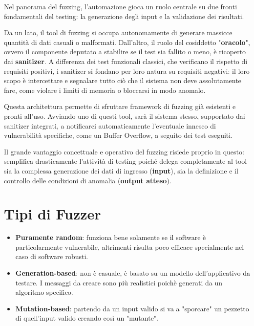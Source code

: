 Nel panorama del fuzzing, l'automazione gioca un ruolo centrale su due fronti 
fondamentali del testing: la generazione degli input e la validazione dei risultati.

Da un lato, il tool di fuzzing si occupa autonomamente di generare massicce quantità 
di dati casuali o malformati. Dall'altro, il ruolo del cosiddetto "\textbf{oracolo}", 
ovvero il componente deputato a stabilire se il test sia fallito o meno, è ricoperto 
dai \textbf{sanitizer}. A differenza dei test funzionali classici, che verificano il 
rispetto di requisiti positivi, i sanitizer si fondano per loro natura su requisiti 
negativi: il loro scopo è intercettare e segnalare tutto ciò che il sistema non deve 
assolutamente fare, come violare i limiti di memoria o bloccarsi in modo anomalo.

Questa architettura permette di sfruttare framework di fuzzing già esistenti e pronti 
all'uso. Avviando uno di questi tool, sarà il sistema stesso, supportato dai sanitizer 
integrati, a notificarci automaticamente l'eventuale innesco di vulnerabilità 
specifiche, come un Buffer Overflow, a seguito dei test eseguiti.

Il grande vantaggio concettuale e operativo del fuzzing risiede proprio in questo: 
semplifica drasticamente l'attività di testing poiché delega completamente al tool sia 
la complessa generazione dei dati di ingresso (\textbf{input}), sia la definizione e il 
controllo delle condizioni di anomalia (\textbf{output atteso}).

\section{Tipi di Fuzzer}

\begin{itemize}
    \item \textbf{Puramente random}: funziona bene solamente se il software è 
    particolarmente vulnerabile, altrimenti risulta poco efficace specialmente nel 
    caso di software robusti.
    \item \textbf{Generation-based}: non è casuale, è basato su un modello dell'applicativo 
     da testare. I messaggi da creare sono più realistici poichè generati da un 
     algoritmo specifico.
    \item \textbf{Mutation-based}: partendo da un input valido si va a "sporcare" un 
    pezzetto di quell'input valido creando così un "mutante".
\end{itemize}


